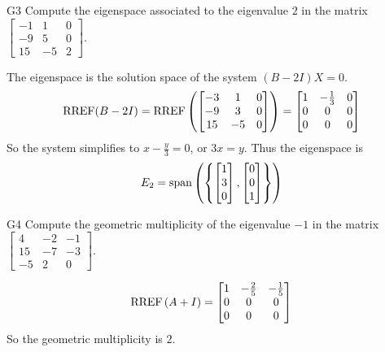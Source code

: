\documentclass{sbgLAsemi}
\begin{document}
\begin{problem}{G3}
Compute the eigenspace associated to the eigenvalue $2$ in the matrix $\begin{bmatrix} -1 & 1 & 0 \\ -9 & 5 & 0 \\ 15 & -5 & 2 \end{bmatrix}$.
\end{problem}

\begin{solution}
The eigenspace is the solution space of the system $(B-2I)X=0$.
$$\operatorname{RREF}(B-2I)=\operatorname{RREF}\left(\begin{bmatrix} -3 & 1 & 0 \\ -9 & 3 & 0 \\ 15 & - 5 & 0 \end{bmatrix} \right) = \begin{bmatrix} 1 & -\frac{1}{3} & 0 \\ 0 & 0 & 0 \\ 0 & 0 & 0 \end{bmatrix}$$
So the system simplifies to $x-\frac{y}{3}=0$, or $3x=y$.  Thus the eigenspace is $$E_2 = {\rm span}\left( \left\{ \begin{bmatrix} 1 \\ 3 \\ 0 \end{bmatrix}, \begin{bmatrix} 0 \\ 0 \\ 1\end{bmatrix} \right\} \right)$$
\end{solution}
\begin{problem}{G4}
Compute the geometric multiplicity of the eigenvalue $-1$ in the matrix $\begin{bmatrix} 4 & -2 & -1 \\ 15 & -7 & -3 \\ -5 & 2 & 0 \end{bmatrix}$.  \end{problem}
\begin{solution}
$$\operatorname{RREF}\left(A+I\right) = \begin{bmatrix} 1 & - \frac{2}{5} & -\frac{1}{5} \\ 0 & 0 & 0 \\ 0 & 0 & 0 \end{bmatrix}$$
So the geometric multiplicity is $2$.
\end{solution}
\end{document}
